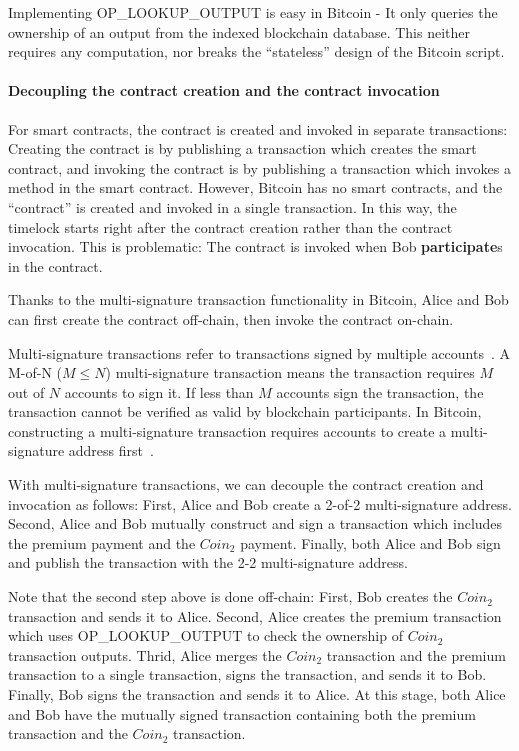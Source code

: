Implementing OP\_LOOKUP\_OUTPUT is easy in Bitcoin - It only queries the ownership of an output from the indexed blockchain database.
This neither requires any computation, nor breaks the ``stateless'' design of the Bitcoin script.


\paragraph{Decoupling the contract creation and the contract invocation}
For smart contracts, the contract is created and invoked in separate transactions:
Creating the contract is by publishing a transaction which creates the smart contract,
and invoking the contract is by publishing a transaction which invokes a method in the smart contract.
However, Bitcoin has no smart contracts, and the ``contract'' is created and invoked in a single transaction.
In this way, the timelock starts right after the contract creation rather than the contract invocation.
This is problematic: The contract is invoked when Bob \textbf{participate}s in the contract.


Thanks to the multi-signature transaction functionality in Bitcoin,
Alice and Bob can first create the contract off-chain, then invoke the contract on-chain.

Multi-signature transactions refer to transactions signed by multiple accounts~\cite{okupski2014bitcoin}.
A M-of-N ($M \leq N$) multi-signature transaction means the transaction requires $M$ out of $N$ accounts to sign it.
If less than $M$ accounts sign the transaction, the transaction cannot be verified as valid by blockchain participants.
In Bitcoin, constructing a multi-signature transaction requires accounts to create a multi-signature address first~\cite{okupski2014bitcoin}.

With multi-signature transactions, we can decouple the contract creation and invocation as follows:
First, Alice and Bob create a 2-of-2 multi-signature address. 
Second, Alice and Bob mutually construct and sign a transaction which includes the premium payment and the $Coin_2$ payment.
Finally, both Alice and Bob sign and publish the transaction with the 2-2 multi-signature address.

Note that the second step above is done off-chain:
First, Bob creates the $Coin_2$ transaction and sends it to Alice.
Second, Alice creates the premium transaction which uses OP\_LOOKUP\_OUTPUT to check the ownership of $Coin_2$ transaction outputs.
Thrid, Alice merges the $Coin_2$ transaction and the premium transaction to a single transaction, signs the transaction, and sends it to Bob.
Finally, Bob signs the transaction and sends it to Alice.
At this stage, both Alice and Bob have the mutually signed transaction containing both the premium transaction and the $Coin_2$ transaction.

